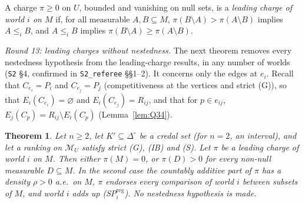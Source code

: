 \documentclass[11pt]{article}
\newtheorem{theorem}{Theorem}[section]
\theoremstyle{definition}
\theoremstyle{remark}
\newcommand{\Di}{\Delta^{\circ}}
\newcommand{\M}{\mathcal M}
\newcommand{\src}[1]{\texttt{#1}}
\begin{document}
A charge $\pi\ge0$ on $U$, bounded and vanishing on null sets, is a \emph{leading charge of world $i$ on $M$} if, for all measurable $A,B\subseteq M$, $\pi(B\setminus A)>\pi(A\setminus B)$ implies $A\le_iB$, and $A\le_iB$ implies $\pi(B\setminus A)\ge\pi(A\setminus B)$.

\emph{Round 13: leading charges without nestedness.} The next theorem removes every nestedness hypothesis from the leading-charge results, in any number of worlds (\src{S2} \S4, confirmed in \src{S2\_referee} \S\S1--2). It concerns only the edges at $e_i$. Recall that $C_{e_i}=P_i$ and $C_{e_j}=P_j$ (competitiveness at the vertices and strict (G)), so that $E_i(C_{e_i})=\varnothing$ and $E_i(C_{e_j})=R_{ij}$, and that for $p\in e_{ij}$, $E_j(C_p)=R_{ij}\setminus E_i(C_p)$ (Lemma~\ref{lem:Q34}).

\begin{theorem}\label{thm:S21}
Let $n\ge2$, let $K'\subseteq\Di$ be a credal set (for $n=2$, an interval), and let a ranking on $\M_U$ satisfy strict (G), (IB) and (S). Let $\pi$ be a leading charge of world $i$ on $M$. Then either $\pi(M)=0$, or $\pi(D)>0$ for every non-null measurable $D\subseteq M$. In the second case the countably additive part of $\pi$ has a density $\rho>0$ a.e.\ on $M$, $\pi$ endorses every comparison of world $i$ between subsets of $M$, and world $i$ adds up (SP$^{\mathrm{reg}}_i$). No nestedness hypothesis is made.
\end{theorem}
\end{document}
